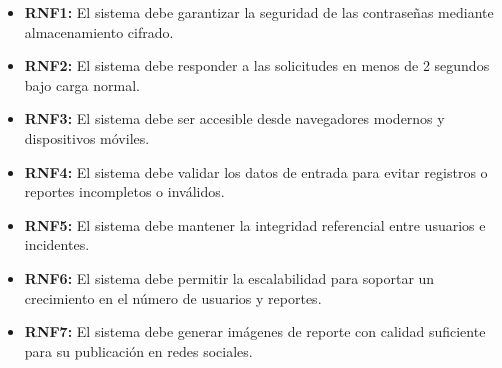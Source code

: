 \begin{itemize}
    \item \textbf{RNF1:} El sistema debe garantizar la seguridad de las contraseñas mediante almacenamiento cifrado.
    \item \textbf{RNF2:} El sistema debe responder a las solicitudes en menos de 2 segundos bajo carga normal.
    \item \textbf{RNF3:} El sistema debe ser accesible desde navegadores modernos y dispositivos móviles.
    \item \textbf{RNF4:} El sistema debe validar los datos de entrada para evitar registros o reportes incompletos o inválidos.
    \item \textbf{RNF5:} El sistema debe mantener la integridad referencial entre usuarios e incidentes.
    \item \textbf{RNF6:} El sistema debe permitir la escalabilidad para soportar un crecimiento en el número de usuarios y reportes.
    \item \textbf{RNF7:} El sistema debe generar imágenes de reporte con calidad suficiente para su publicación en redes sociales.
\end{itemize}